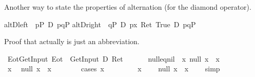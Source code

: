 \begin{isabellebody}
%
\begin{isamarkuptext}%
Another way to state the properties of alternation (for the diamond operator).%
\end{isamarkuptext}%
\isamarkuptrue%
\isanewline
altD{\isacharunderscore}left{\isacharcolon}\ {\isachardoublequote}{\isasymturnstile}\ {\isasymlangle}p{\isasymrangle}P\ {\isasymlongrightarrow}\isactrlsub D\ {\isasymlangle}p{\isasymparallel}q{\isasymrangle}P{\isachardoublequote}\isanewline
altD{\isacharunderscore}right{\isacharcolon}\ {\isachardoublequote}{\isasymturnstile}\ {\isasymlangle}q{\isasymrangle}P\ {\isasymlongrightarrow}\isactrlsub D\ {\isasymlangle}p{\isasymrangle}{\isacharparenleft}{\isasymlambda}x{\isachardot}\ Ret\ True{\isacharparenright}\ {\isasymor}\isactrlsub D\ {\isasymlangle}p{\isasymparallel}q{\isasymrangle}P{\isachardoublequote}\isamarkupfalse%
%
\begin{isamarkuptext}%
Proof that  actually is just an abbreviation.%
\end{isamarkuptext}%
\isamarkuptrue%
\ Eot{\isacharunderscore}GetInput{\isacharcolon}\ {\isachardoublequote}Eot\ {\isacharequal}\ {\isacharparenleft}GetInput\ {\isacharequal}\isactrlsub D\ Ret\ {\isacharbrackleft}{\isacharbrackright}{\isacharparenright}{\isachardoublequote}\isanewline
\isamarkupfalse%
\ {\isacharminus}\isanewline
\ \ \isamarkupfalse%
\ null{\isacharunderscore}eq{\isacharunderscore}nil{\isacharcolon}\ {\isachardoublequote}\ {\isasymforall}x{\isachardot}\ null\ x\ {\isacharequal}\ {\isacharparenleft}x\ {\isacharequal}\ {\isacharbrackleft}{\isacharbrackright}{\isacharparenright}{\isachardoublequote}\isanewline
\ \ \isamarkupfalse%
\isanewline
\ \ \ \ \isamarkupfalse%
\ x\ \isamarkupfalse%
\ {\isachardoublequote}null\ x\ {\isacharequal}\ {\isacharparenleft}x\ {\isacharequal}\ {\isacharbrackleft}{\isacharbrackright}{\isacharparenright}{\isachardoublequote}\isanewline
\ \ \ \ \isamarkupfalse%
\ {\isacharparenleft}cases\ x{\isacharparenright}\ \isanewline
\ \ \ \ \ \ \isamarkupfalse%
\ {\isachardoublequote}x\ {\isacharequal}\ {\isacharbrackleft}{\isacharbrackright}{\isachardoublequote}\ \isamarkupfalse%
\ {\isachardoublequote}null\ x\ {\isacharequal}\ {\isacharparenleft}x\ {\isacharequal}\ {\isacharbrackleft}{\isacharbrackright}{\isacharparenright}{\isachardoublequote}\ \isamarkupfalse%
\ simp\isanewline
\ \ \ \ \isamarkupfalse%
\isanewline

\end{isabellebody}
